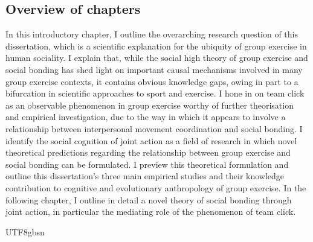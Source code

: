 \begin{CJK}{UTF8}{gbsn}
\section{Overview of chapters\label{sect:chapters}}
In this introductory chapter, I outline the overarching research question of this dissertation, which is a scientific explanation for the ubiquity of group exercise in human sociality.  I explain that, while the social high theory of group exercise and social bonding has shed light on important causal mechanisms involved in many group exercise contexts, it contains obvious knowledge gaps, owing in part to a bifurcation in scientific approaches to sport and exercise.  I hone in on team click as an observable phenomenon in group exercise worthy of further theorisation and empirical investigation, due to the way in which it appears to involve a relationship between interpersonal movement coordination and social bonding.  I identify the social cognition of joint action as a field of research in which novel theoretical predictions regarding the relationship between group exercise and social bonding can be formulated.  I preview this theoretical formulation and outline this dissertation's three main empirical studies and their knowledge contribution to cognitive and evolutionary anthropology of group exercise.  In the following chapter, I outline in detail a novel theory of social bonding through joint action, in particular the mediating role of the phenomenon of team click.




                                              \end{CJK}{UTF8}{gbsn}
